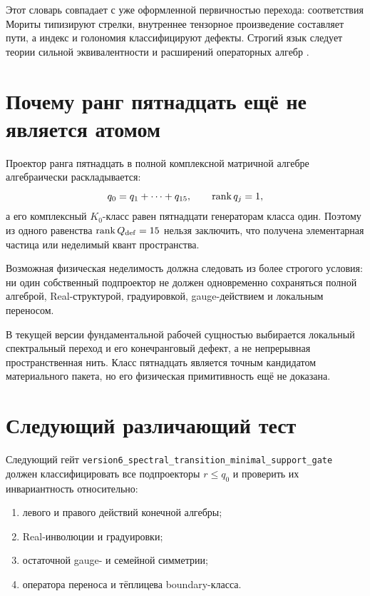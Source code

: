Этот словарь совпадает с уже оформленной первичностью перехода:
соответствия Мориты типизируют стрелки, внутреннее тензорное произведение
составляет пути, а индекс и голономия классифицируют дефекты. Строгий язык
следует теории сильной эквивалентности и расширений операторных алгебр
\cite{transition-brown-green-rieffel1977,
transition-pimsner-voiculescu1980}.

\section{Почему ранг пятнадцать ещё не является атомом}

Проектор ранга пятнадцать в полной комплексной матричной алгебре
алгебраически раскладывается:
\begin{equation}
 q_0=q_1+\cdots+q_{15},
 \qquad \operatorname{rank} q_j=1,
\end{equation}
а его комплексный $K_0$-класс равен пятнадцати генераторам класса один.
Поэтому из одного равенства $\operatorname{rank} Q_{\rm def}=15$ нельзя заключить, что
получена элементарная частица или неделимый квант пространства.

Возможная физическая неделимость должна следовать из более строгого
условия: ни один собственный подпроектор не должен одновременно
сохраняться полной алгеброй, Real-структурой, градуировкой, gauge-действием
и локальным переносом.

\begin{theorem}
В текущей версии фундаментальной рабочей сущностью выбирается локальный
спектральный переход и его конечранговый дефект, а не непрерывная
пространственная нить. Класс пятнадцать является точным кандидатом
материального пакета, но его физическая примитивность ещё не доказана.
\end{theorem}

\section{Следующий различающий тест}

Следующий гейт
\texttt{version6\_spectral\_transition\_minimal\_support\_gate}
должен классифицировать все подпроекторы $r\le q_0$ и проверить их
инвариантность относительно:
\begin{enumerate}
 \item левого и правого действий конечной алгебры;
 \item Real-инволюции и градуировки;
 \item остаточной gauge- и семейной симметрии;
 \item оператора переноса и тёплицева boundary-класса.
\end{enumerate}

